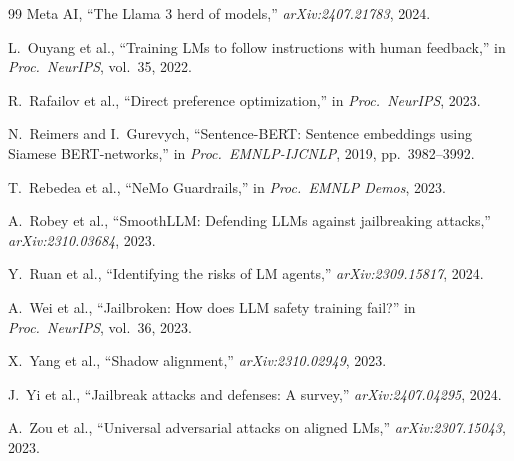\documentclass[conference]{IEEEtran}
\begin{document}
\begin{thebibliography}{99}
Meta AI, ``The Llama 3 herd of models,'' \textit{arXiv:2407.21783}, 2024.

L.\ Ouyang et al., ``Training LMs to follow instructions with human feedback,''
in \textit{Proc.\ NeurIPS}, vol.\ 35, 2022.

R.\ Rafailov et al., ``Direct preference optimization,'' in \textit{Proc.\ NeurIPS}, 2023.

N.\ Reimers and I.\ Gurevych, ``Sentence-BERT: Sentence embeddings using
Siamese BERT-networks,'' in \textit{Proc.\ EMNLP-IJCNLP}, 2019, pp.\ 3982--3992.

T.\ Rebedea et al., ``NeMo Guardrails,'' in \textit{Proc.\ EMNLP Demos}, 2023.

A.\ Robey et al., ``SmoothLLM: Defending LLMs against jailbreaking attacks,''
\textit{arXiv:2310.03684}, 2023.

Y.\ Ruan et al., ``Identifying the risks of LM agents,'' \textit{arXiv:2309.15817}, 2024.

A.\ Wei et al., ``Jailbroken: How does LLM safety training fail?''
in \textit{Proc.\ NeurIPS}, vol.\ 36, 2023.

X.\ Yang et al., ``Shadow alignment,'' \textit{arXiv:2310.02949}, 2023.

J.\ Yi et al., ``Jailbreak attacks and defenses: A survey,''
\textit{arXiv:2407.04295}, 2024.

A.\ Zou et al., ``Universal adversarial attacks on aligned LMs,''
\textit{arXiv:2307.15043}, 2023.

\end{thebibliography}
\end{document}
